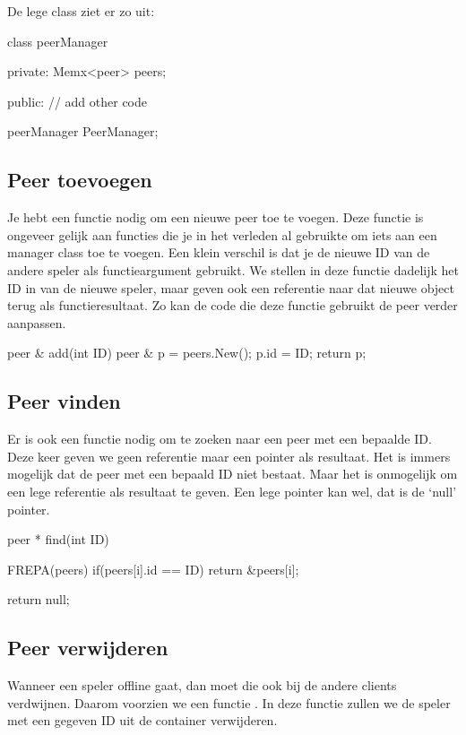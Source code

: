 De lege class ziet er zo uit:

\begin{code}
class peerManager {
private:
  Memx<peer> peers;
	
public:
  // add other code
}

peerManager PeerManager;
\end{code}

\subsection{Peer toevoegen}
Je hebt een functie nodig om een nieuwe peer toe te voegen. Deze functie is ongeveer gelijk aan functies die je in het verleden al gebruikte om iets aan een manager class toe te voegen. Een klein verschil is dat je de nieuwe ID van de andere speler als functieargument gebruikt. We stellen in deze functie dadelijk het ID in van de nieuwe speler, maar geven ook een referentie naar dat nieuwe object terug als functieresultaat. Zo kan de code die deze functie gebruikt de peer verder aanpassen.

\begin{code}
peer & add(int ID)
{
	peer & p = peers.New();
	p.id = ID;
	return p;
}
\end{code}

\subsection{Peer vinden}
Er is ook een functie nodig om te zoeken naar een peer met een bepaalde ID. Deze keer geven we geen referentie maar een pointer als resultaat. Het is immers mogelijk dat de peer met een bepaald ID niet bestaat. Maar het is onmogelijk om een lege referentie als resultaat te geven. Een lege pointer kan wel, dat is de `null' pointer.

\begin{code}
peer * find(int ID) 
{
	FREPA(peers)
	{
		 if(peers[i].id == ID)
		 {
				return &peers[i];
		 }
	}
	
	return null;
} 
\end{code}

\subsection{Peer verwijderen}
Wanneer een speler offline gaat, dan moet die ook bij de andere clients verdwijnen. Daarom voorzien we een functie . In deze functie zullen we de speler met een gegeven ID uit de container verwijderen.

